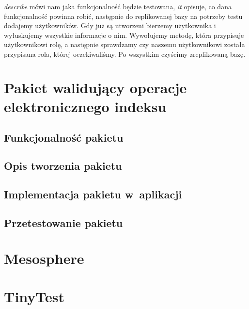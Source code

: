 \documentclass{xmgr}
\begin{document}
\textit{describe} mówi nam jaka funkcjonalność będzie testowana, \textit{it} opisuje, co dana funkcjonalność powinna robić, następnie do replikowanej bazy na potrzeby testu dodajemy użytkowników. Gdy już są utworzeni bierzemy użytkownika i wyłuskujemy wszystkie informacje o nim. Wywołujemy metodę, która przypisuje użytkownikowi rolę, a następnie sprawdzamy czy naszemu użytkownikowi została przypisana rola, której oczekiwaliśmy. Po wszystkim czyścimy zreplikowaną bazę.  

\cite{Laika}

\chapter{Pakiet walidujący operacje elektronicznego indeksu}

\section{Funkcjonalność pakietu}
\section{Opis tworzenia pakietu}
\cite{Packages}
\cite{MeteorDocs}
\cite{DiscoverMeteor2013}
\section{Implementacja pakietu w~aplikacji}
\section{Przetestowanie pakietu}
\cite{TinyTest}

\summary

\appendix
\chapter{Mesosphere}


\chapter{TinyTest}





\listoftables

\listoffigures

\oswiadczenie
\end{document}

